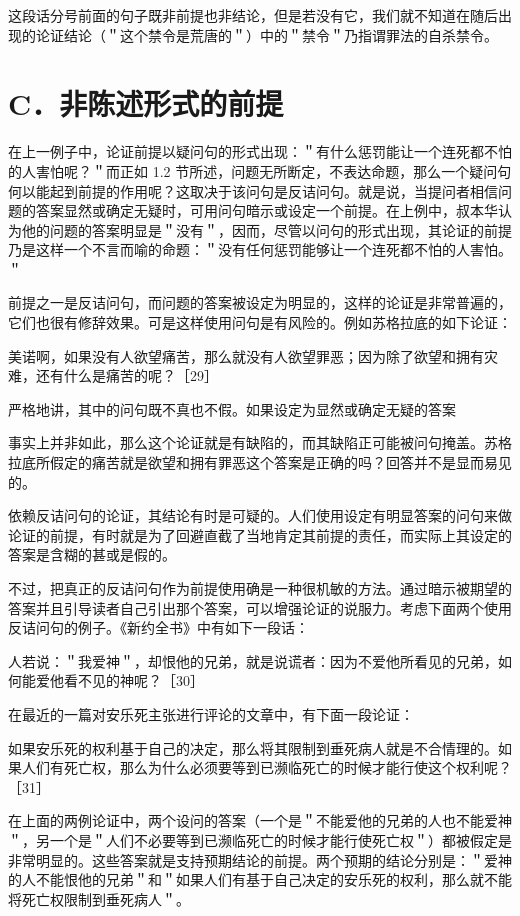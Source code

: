 这段话分号前面的句子既非前提也非结论，但是若没有它，我们就不知道在随后出现的论证结论（＂这个禁令是荒唐的＂）中的＂禁令＂乃指谓罪法的自杀禁令。

\section*{C．非陈述形式的前提}
在上一例子中，论证前提以疑问句的形式出现：＂有什么惩罚能让一个连死都不怕的人害怕呢？＂而正如 1.2 节所述，问题无所断定，不表达命题，那么一个疑问句何以能起到前提的作用呢？这取决于该问句是反诘问句。就是说，当提问者相信问题的答案显然或确定无疑时，可用问句暗示或设定一个前提。在上例中，叔本华认为他的问题的答案明显是＂没有＂，因而，尽管以问句的形式出现，其论证的前提乃是这样一个不言而喻的命题：＂没有任何惩罚能够让一个连死都不怕的人害怕。＂

前提之一是反诘问句，而问题的答案被设定为明显的，这样的论证是非常普遍的，它们也很有修辞效果。可是这样使用问句是有风险的。例如苏格拉底的如下论证：

美诺啊，如果没有人欲望痛苦，那么就没有人欲望罪恶；因为除了欲望和拥有灾难，还有什么是痛苦的呢？［29］

严格地讲，其中的问句既不真也不假。如果设定为显然或确定无疑的答案

事实上并非如此，那么这个论证就是有缺陷的，而其缺陷正可能被问句掩盖。苏格拉底所假定的痛苦就是欲望和拥有罪恶这个答案是正确的吗？回答并不是显而易见的。

依赖反诘问句的论证，其结论有时是可疑的。人们使用设定有明显答案的问句来做论证的前提，有时就是为了回避直截了当地肯定其前提的责任，而实际上其设定的答案是含糊的甚或是假的。

不过，把真正的反诘问句作为前提使用确是一种很机敏的方法。通过暗示被期望的答案并且引导读者自己引出那个答案，可以增强论证的说服力。考虑下面两个使用反诘问句的例子。《新约全书》中有如下一段话：

\begin{displayquote}
人若说：＂我爱神＂，却恨他的兄弟，就是说谎者：因为不爱他所看见的兄弟，如何能爱他看不见的神呢？［30］
\end{displayquote}

在最近的一篇对安乐死主张进行评论的文章中，有下面一段论证：

\begin{displayquote}
如果安乐死的权利基于自己的决定，那么将其限制到垂死病人就是不合情理的。如果人们有死亡权，那么为什么必须要等到已濒临死亡的时候才能行使这个权利呢？［31］
\end{displayquote}

在上面的两例论证中，两个设问的答案（一个是＂不能爱他的兄弟的人也不能爱神＂，另一个是＂人们不必要等到已濒临死亡的时候才能行使死亡权＂）都被假定是非常明显的。这些答案就是支持预期结论的前提。两个预期的结论分别是：＂爱神的人不能恨他的兄弟＂和＂如果人们有基于自己决定的安乐死的权利，那么就不能将死亡权限制到垂死病人＂。

